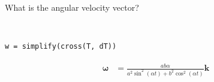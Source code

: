 What is the angular velocity vector?

\begin{solution} \
\begin{lstlisting}
w = simplify(cross(T, dT))
\end{lstlisting}

\begin{align*}
    \boldsymbol{\omega} &= \frac{ab\alpha}{a^2\sin^2(\alpha t) + b^2\cos^2(\alpha t)} \hat{\boldsymbol{k}}
\end{align*}
\end{solution}